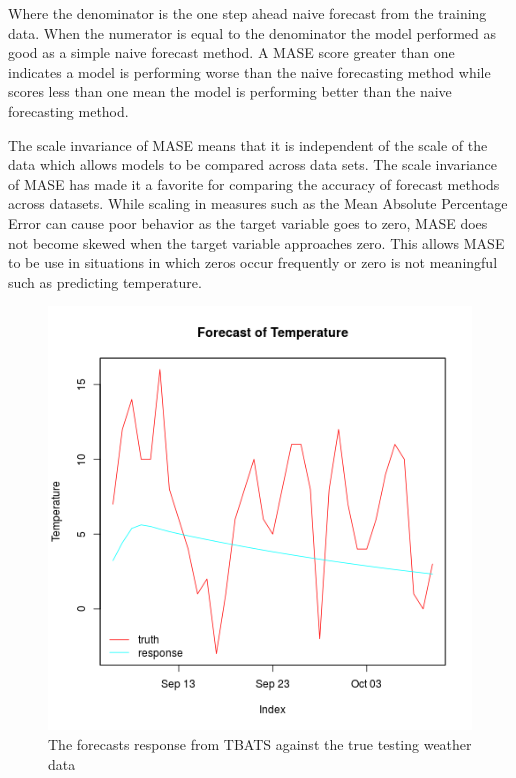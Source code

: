 \documentclass[12pt]{article}\usepackage[]{graphicx}\usepackage[]{color}
\theoremstyle{definition}
\begin{document}
Where the denominator is the one step ahead naive forecast from the training data. When the numerator is equal to the denominator the model performed as good as a simple naive forecast method. A MASE score greater than one indicates a model is performing worse than the naive forecasting method while scores less than one mean the model is performing better than the naive forecasting method.

The scale invariance of MASE means that it is independent of the scale of the data which allows models to be compared across data sets. The scale invariance of MASE has made it a favorite for comparing the accuracy of forecast methods~\cite{noteMase} across datasets. While scaling in measures such as the Mean Absolute Percentage Error can cause poor behavior as the target variable goes to zero, MASE does not become skewed when the target variable approaches zero. This allows MASE to be use in situations in which zeros occur frequently or zero is not meaningful such as predicting temperature. 

\singlespacing

\begin{figure}[H]
\includegraphics[width=\linewidth]{plot_tbats_train.png}
\centering
\caption{The forecasts response from TBATS against the true testing weather data}
\label{fig:tbats_train}
\end{figure}
\end{document}
